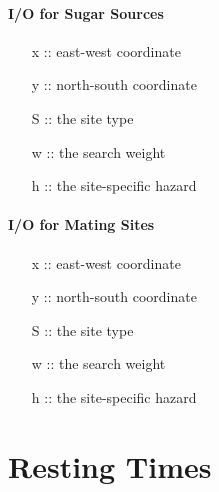 \documentclass{article}
\newcommand{\ie}{{\em i.e., }}
\begin{document}
\paragraph{I/O for Sugar Sources}

\begin{itemize}
\item [x] :: east-west coordinate
\item [y] :: north-south coordinate
\item [S] :: the site type
\item [w] :: the search weight
\item [h] :: the site-specific hazard
\end{itemize} 

\paragraph{I/O for Mating Sites}

\begin{itemize}
\item [x] :: east-west coordinate
\item [y] :: north-south coordinate
\item [S] :: the site type
\item [w] :: the search weight
\item [h] :: the site-specific hazard
\end{itemize} 


\section{Resting Times}
\end{document}
